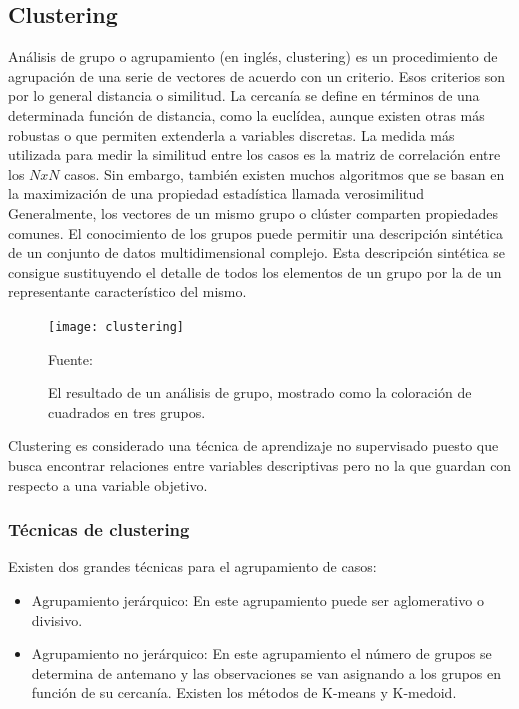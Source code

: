 \subsection{Clustering}

Análisis de grupo o agrupamiento (en inglés, clustering) es un procedimiento de agrupación de una serie de vectores de acuerdo con un criterio. Esos criterios son por lo general distancia o similitud. La cercanía se define en términos de una determinada función de distancia, como la euclídea, aunque existen otras más robustas o que permiten extenderla a variables discretas. La medida más utilizada para medir la similitud entre los casos es la matriz de correlación entre los \( N x N \) casos. Sin embargo, también existen muchos algoritmos que se basan en la maximización de una propiedad estadística llamada verosimilitud \citep{Leonard_Peter}
\vskip 1cm
Generalmente, los vectores de un mismo grupo o clúster comparten propiedades comunes. El conocimiento de los grupos puede permitir una descripción sintética de un conjunto de datos multidimensional complejo. Esta descripción sintética se consigue sustituyendo el detalle de todos los elementos de un grupo por la de un representante característico del mismo.

\begin{figure}[ht]
	\begin{center}
		\texttt{[image: clustering]}
	\end{center}
	\begin{center}
		\vskip -0.5cm
		\caption{\small{El resultado de un análisis de grupo, mostrado como la coloración de cuadrados en tres grupos.}}
		{\small{Fuente: }}
	\end{center}
\end{figure}

Clustering es considerado una técnica de aprendizaje no supervisado puesto que busca encontrar relaciones entre variables descriptivas pero no la que guardan con respecto a una variable objetivo.


\subsubsection{Técnicas de clustering}

Existen dos grandes técnicas para el agrupamiento de casos:

\begin{itemize}
	\item Agrupamiento jerárquico: En este agrupamiento puede ser aglomerativo o divisivo.
	\item Agrupamiento no jerárquico: En este agrupamiento el número de grupos se determina de antemano y las observaciones se van asignando a los grupos en función de su cercanía. Existen los métodos de K-means y K-medoid.

\end{itemize}

